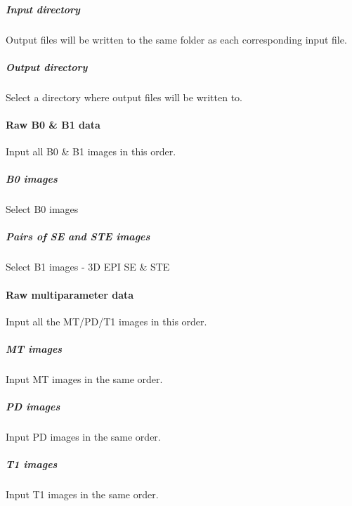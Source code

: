 \subparagraph{Input directory}
Output files will be written to the same folder as each corresponding input file.


\subparagraph{Output directory}
Select a directory where output files will be written to.


\paragraph{Raw B0 \& B1 data}
Input all B0 \& B1 images in this order.


\subparagraph{B0 images}
Select B0 images


\subparagraph{Pairs of SE and STE images}
Select B1 images - 3D EPI SE \& STE


\paragraph{Raw multiparameter data}
Input all the MT/PD/T1 images in this order.


\subparagraph{MT images}
Input MT images in the same order.


\subparagraph{PD images}
Input PD images in the same order.


\subparagraph{T1 images}
Input T1 images in the same order.


